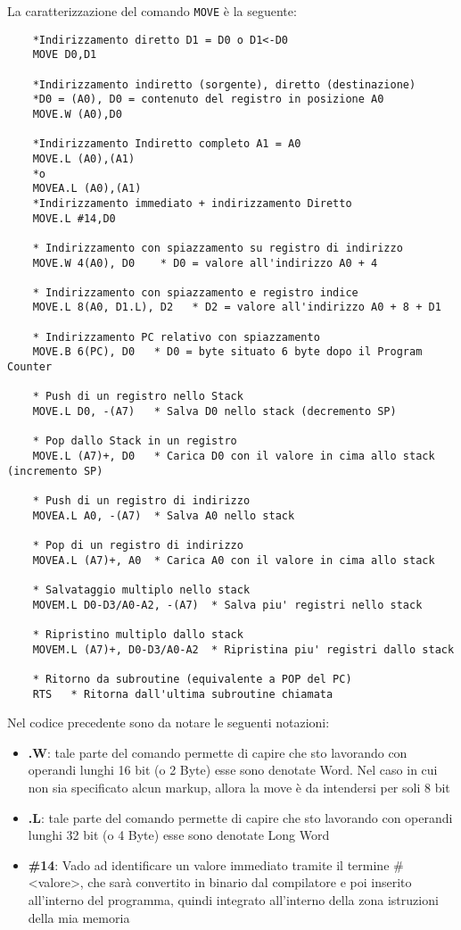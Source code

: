 La caratterizzazione del comando \lstinline|MOVE| è la seguente:
\begin{lstlisting}
    *Indirizzamento diretto D1 = D0 o D1<-D0
    MOVE D0,D1

    *Indirizzamento indiretto (sorgente), diretto (destinazione)
    *D0 = (A0), D0 = contenuto del registro in posizione A0
    MOVE.W (A0),D0

    *Indirizzamento Indiretto completo A1 = A0
    MOVE.L (A0),(A1)
    *o
    MOVEA.L (A0),(A1)
    *Indirizzamento immediato + indirizzamento Diretto
    MOVE.L #14,D0

    * Indirizzamento con spiazzamento su registro di indirizzo
    MOVE.W 4(A0), D0    * D0 = valore all'indirizzo A0 + 4

    * Indirizzamento con spiazzamento e registro indice
    MOVE.L 8(A0, D1.L), D2   * D2 = valore all'indirizzo A0 + 8 + D1

    * Indirizzamento PC relativo con spiazzamento
    MOVE.B 6(PC), D0   * D0 = byte situato 6 byte dopo il Program Counter

    * Push di un registro nello Stack
    MOVE.L D0, -(A7)   * Salva D0 nello stack (decremento SP)

    * Pop dallo Stack in un registro
    MOVE.L (A7)+, D0   * Carica D0 con il valore in cima allo stack (incremento SP)

    * Push di un registro di indirizzo
    MOVEA.L A0, -(A7)  * Salva A0 nello stack

    * Pop di un registro di indirizzo
    MOVEA.L (A7)+, A0  * Carica A0 con il valore in cima allo stack

    * Salvataggio multiplo nello stack
    MOVEM.L D0-D3/A0-A2, -(A7)  * Salva piu' registri nello stack

    * Ripristino multiplo dallo stack
    MOVEM.L (A7)+, D0-D3/A0-A2  * Ripristina piu' registri dallo stack

    * Ritorno da subroutine (equivalente a POP del PC)
    RTS   * Ritorna dall'ultima subroutine chiamata
\end{lstlisting}

Nel codice precedente sono da notare le seguenti notazioni:
\begin{itemize}
    \item \textbf{.W}: tale parte del comando permette di capire che sto lavorando con operandi lunghi 16 bit (o 2 Byte) esse sono denotate Word. Nel caso in cui non sia specificato alcun markup, allora la move è da intendersi per soli 8 bit
    \item \textbf{.L}: tale parte del comando permette di capire che sto lavorando con operandi lunghi 32 bit (o 4 Byte) esse sono denotate Long Word
    \item \textbf{\#14}: Vado ad identificare un valore immediato tramite il termine \#<valore>, che sarà convertito in binario dal compilatore e poi inserito all'interno del programma, quindi integrato all'interno della zona istruzioni della mia memoria
\end{itemize}

